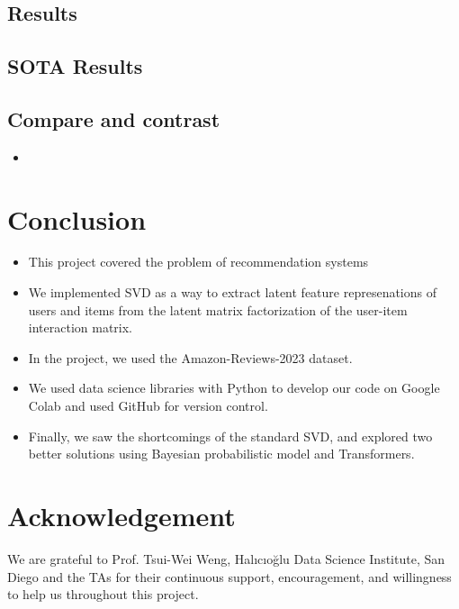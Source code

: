\documentclass{article}
\begin{document}


\subsection{Results}

\subsection{SOTA Results}

\subsection{Compare and contrast}
\begin{itemize}
    \item
\end{itemize}


\section{Conclusion}
\begin{itemize}
    \item This project covered the problem of recommendation systems
    \item We implemented SVD as a way to extract latent feature represenations of users and items from the latent matrix factorization of the user-item interaction matrix.
    \item In the project, we used the Amazon-Reviews-2023 dataset.
    \item We used data science libraries with Python to develop our code on Google Colab and used GitHub for version control.
    \item Finally, we saw the shortcomings of the standard SVD, and explored two better solutions using Bayesian probabilistic model and Transformers.
\end{itemize}

\section{Acknowledgement}
We are grateful to Prof. Tsui-Wei Weng, Halıcıoğlu Data Science Institute, San Diego and the TAs for their continuous support, encouragement, and willingness to help us throughout this project.



\end{document}
